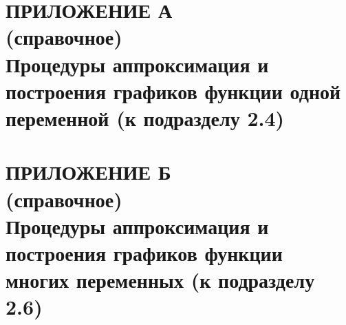 \renewcommand{\thefigure}{\Asbuk{section}.\arabic{figure}}
\renewcommand{\thetable}{\Asbuk{section}.\arabic{table}}
\renewcommand{\thelstlisting}{\Asbuk{section}.\arabic{lstlisting}}

\pagestyle{fancy}
\fancyhf{} %
\fancyfoot[R]{\thepage}
\renewcommand{\headrulewidth}{0pt}
\renewcommand{\footrulewidth}{0pt}

\setlength{\headheight}{10mm}
\setlength{\headsep}{\baselineskip}

\section*{ПРИЛОЖЕНИЕ А\\(справочное)\\ Процедуры аппроксимация и построения графиков функции одной переменной (к подразделу 2.4)}

\thispagestyle{plain}
\setcounter{section}{1}
\setcounter{figure}{0}
\setcounter{table}{0}
\setcounter{lstlisting}{0}





\setlength{\headheight}{10mm}
\setlength{\headsep}{\baselineskip}
\section*{ПРИЛОЖЕНИЕ Б\\(справочное)\\ Процедуры аппроксимация и построения графиков функции многих переменных (к подразделу 2.6)}

\thispagestyle{plain}
\setcounter{section}{2}
\setcounter{figure}{0}
\setcounter{table}{0}
\setcounter{lstlisting}{0}


